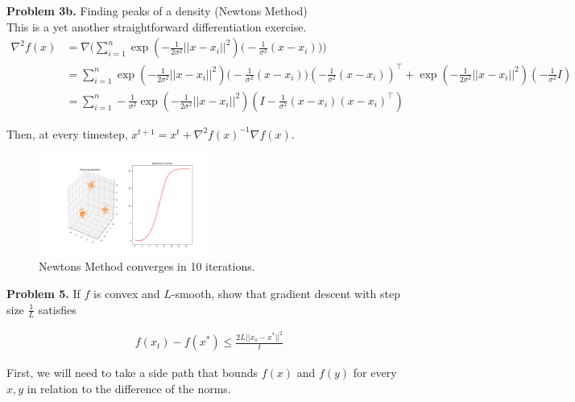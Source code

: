 \documentclass[a4paper]{article}
\begin{document}
\textbf{Problem 3b.} Finding peaks of a density (Newtons Method) \\

This is a yet another straightforward differentiation exercise.
\begin{align*}
    \nabla^2 f(x) &= \nabla \Big( \sum_{i=1}^n \exp(-\frac{1}{2 \sigma^2} ||x - x_i||^2) \Big(-\frac{1}{\sigma^2} (x - x_i) \Big) \Big) \\
                  &= \sum_{i=1}^n \exp(-\frac{1}{2 \sigma^2} ||x - x_i||^2) \Big(-\frac{1}{\sigma^2} (x - x_i) \Big) (-\frac{1}{\sigma^2} (x - x_i))^\intercal + \exp(-\frac{1}{2 \sigma^2} ||x - x_i||^2) (-\frac{1}{\sigma^2} I) \\
                  &= \sum_{i=1}^n -\frac{1}{\sigma^2} \exp(-\frac{1}{2 \sigma^2} ||x - x_i||^2) (I - \frac{1}{\sigma^2} (x - x_i) (x - x_i)^\intercal)
\end{align*}

Then, at every timestep, $x^{t+1} = x^t + \nabla^2 f(x)^{-1} \nabla f(x)$.
\begin{figure}[!h]
\centering
\includegraphics[width=0.5\textwidth]{cs395t_graphics_hw2_newtons.png}
\caption{Newtons Method converges in 10 iterations.}
\end{figure}

\pagebreak

\textbf{Problem 5.} If $f$ is convex and $L$-smooth, show that gradient descent with step size $\frac{1}{L}$ satisfies

\begin{align*}
    f(x_t) - f(x^*) \leq \frac{2 L ||x_o - x^*||^2}{t}
\end{align*}

First, we will need to take a side path that bounds $f(x)$ and $f(y)$ for every $x, y$ in relation to the difference of the norms. \\
\end{document}
